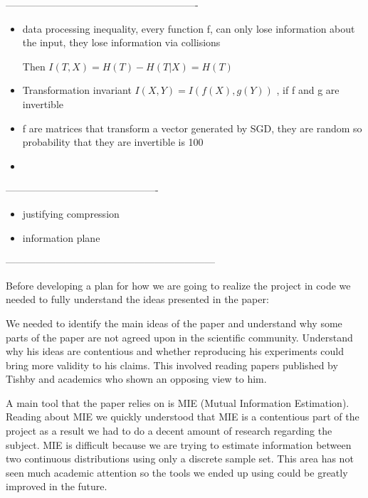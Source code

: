----------------------------------------------------------


\begin{itemize}
  \item{
      data processing inequality, every function f, can only lose information
      about the input, they lose information via collisions

      Then $I(T, X) = H(T) - H(T|X) = H(T)$
    }
  \item{
      Transformation invariant $I(X, Y) = I(f(X), g(Y))$ , if f and g are
      invertible
    }
  \item{
      f are matrices that transform a vector generated by SGD, they are random
      so probability that they are invertible is 100%
    }
  \item{
      
    }
\end{itemize}

----------------------------------------------

\begin{itemize}
  \item{
      justifying compression
    }
  \item{
      information plane
    }
\end{itemize}


---------------------------------------------------------------


Before developing a plan for how we are going to realize the project in code we
needed to fully understand the ideas presented in the paper:
\begin{itemize}
    \begin{item}
      We needed to identify the main ideas of the paper and understand why some
      parts of the paper are not agreed upon in the scientific community.
      Understand why his ideas are contentious and whether reproducing his
      experiments could bring more validity to his claims. This involved reading
      papers published by Tishby and academics who shown an opposing view to
      him.
    \end{item}
    \begin{item}
      A main tool that the paper relies on is MIE (Mutual Information
      Estimation). Reading about MIE we quickly understood that MIE is a
      contentious part of the project as a result we had to do a decent amount
      of research regarding the subject. MIE is difficult because we are trying
      to estimate information between two continuous distributions using only a
      discrete sample set. This area has not seen much academic attention so the
      tools we ended up using could be greatly improved in the future.
    \end{item}
\end{itemize}

